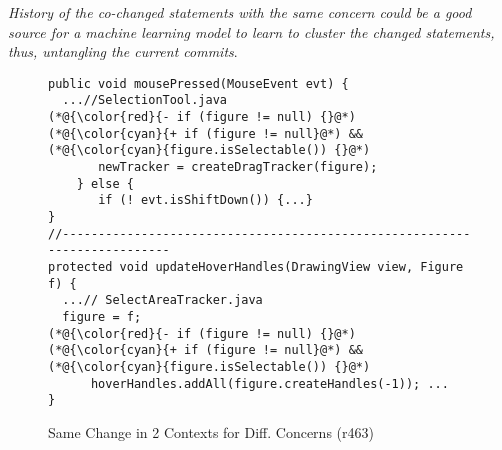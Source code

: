 

\vspace{3pt}
 {\em
  History of the co-changed statements with the same concern could be
  a good source for a machine learning model to learn to cluster the
  changed statements, thus, untangling the current commits}.

\begin{figure}[t]
	\centering
	\begin{lstlisting}[]
public void mousePressed(MouseEvent evt) { 
  ...//SelectionTool.java
(*@{\color{red}{- if (figure != null) {}@*)
(*@{\color{cyan}{+ if (figure != null}@*) && (*@{\color{cyan}{figure.isSelectable()) {}@*)
       newTracker = createDragTracker(figure);
    } else {
       if (! evt.isShiftDown()) {...}
}
//--------------------------------------------------------------------------
protected void updateHoverHandles(DrawingView view, Figure f) {
  ...// SelectAreaTracker.java
  figure = f;
(*@{\color{red}{- if (figure != null) {}@*)
(*@{\color{cyan}{+ if (figure != null}@*) && (*@{\color{cyan}{figure.isSelectable()) {}@*)
      hoverHandles.addAll(figure.createHandles(-1)); ...
}
	\end{lstlisting}
        \vspace{-15pt}
        \caption{Same Change in 2 Contexts for Diff. Concerns (r463)}
        \vspace{-6pt}
        \label{fig:motiv-context}
\end{figure}



